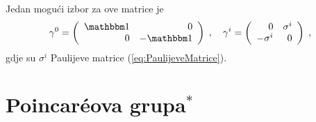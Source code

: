 Jedan mogući izbor za ove matrice je
\begin{equation}
\gamma^0 = \left(\begin{array}{rr} \Eins & 0 \\
                        0 & -\Eins \end{array}\right)
\;, \quad
\gamma^i = \left(\begin{array}{rr} 0 & \sigma^i \\
                        -\sigma^i & 0 \end{array}\right) \;,
\end{equation}
gdje su $\sigma^i$ Paulijeve matrice (\ref{eq:PaulijeveMatrice}).

\section{Poincar\'{e}ova grupa$^*$}


